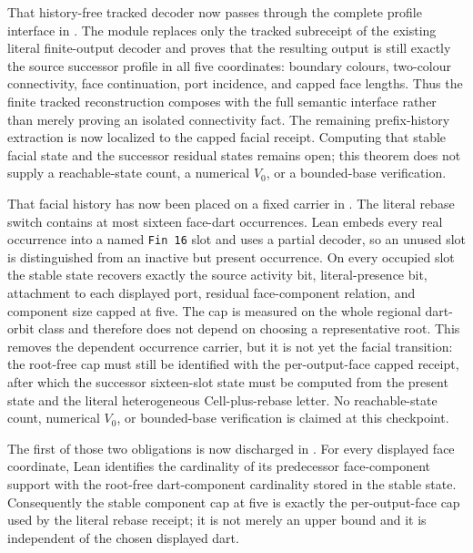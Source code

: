 \documentclass[11pt]{article}
\theoremstyle{definition}
\begin{document}
That history-free tracked decoder now passes through the complete profile
interface in
.
The module replaces only the tracked subreceipt of the existing literal
finite-output decoder and proves that the resulting output is still exactly
the source successor profile in all five coordinates: boundary colours,
two-colour connectivity, face continuation, port incidence, and capped face
lengths.  Thus the finite tracked reconstruction composes with the full
semantic interface rather than merely proving an isolated connectivity
fact.  The remaining prefix-history extraction is now localized to the
capped facial receipt.  Computing that stable facial state and the successor
residual states remains open; this theorem does not supply a reachable-state
count, a numerical $V_0$, or a bounded-base verification.

That facial history has now been placed on a fixed carrier in
.
The literal rebase switch contains at most sixteen face-dart occurrences.
Lean embeds every real occurrence into a named \texttt{Fin 16} slot and uses a
partial decoder, so an unused slot is distinguished from an inactive but
present occurrence.  On every occupied slot the stable state recovers exactly
the source activity bit, literal-presence bit, attachment to each displayed
port, residual face-component relation, and component size capped at five.
The cap is measured on the whole regional dart-orbit class and therefore does
not depend on choosing a representative root.  This removes the dependent
occurrence carrier, but it is not yet the facial transition: the root-free cap
must still be identified with the per-output-face capped receipt, after which
the successor sixteen-slot state must be computed from the present state and
the literal heterogeneous Cell-plus-rebase letter.  No reachable-state count,
numerical $V_0$, or bounded-base verification is claimed at this checkpoint.

The first of those two obligations is now discharged in
.
For every displayed face coordinate, Lean identifies the cardinality of its
predecessor face-component support with the root-free dart-component
cardinality stored in the stable state.  Consequently the stable component cap
at five is exactly the per-output-face cap used by the literal rebase receipt;
it is not merely an upper bound and it is independent of the chosen displayed
dart.
\end{document}
